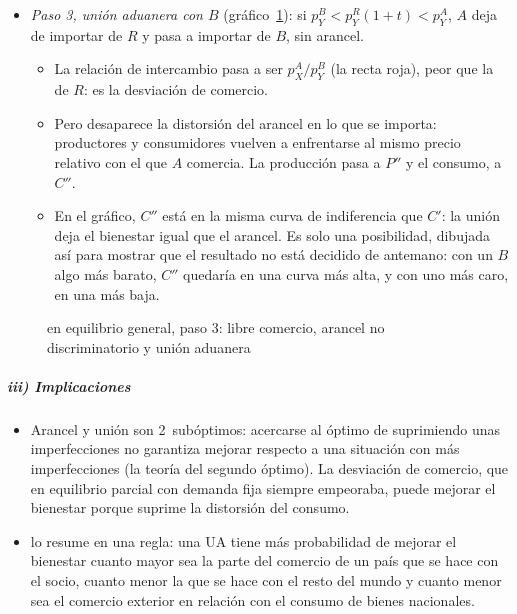 \documentclass[11pt]{article}
\begin{document}
\begin{itemize}
\item \emph{Paso 3, unión aduanera con $B$} (gráfico~\ref{fig:lipsey-eg}): si $p_Y^B<p_Y^R(1+t)<p_Y^A$, $A$ deja de importar de $R$ y pasa a importar de $B$, sin arancel.
  \begin{itemize}
  \item La relación de intercambio pasa a ser $p_X^A/p_Y^B$ (la recta roja), peor que la de $R$: es la desviación de comercio.
  \item Pero desaparece la distorsión del arancel en lo que se importa: productores y consumidores vuelven a enfrentarse al mismo precio relativo con el que $A$ comercia. La producción pasa a $P''$ y el consumo, a $C''$.
  \item En el gráfico, $C''$ está en la misma curva de indiferencia que $C'$: la unión deja el bienestar igual que el arancel. Es solo una posibilidad, dibujada así para mostrar que el resultado no está decidido de antemano: con un $B$ algo más barato, $C''$ quedaría en una curva más alta, y con uno más caro, en una más baja.
  \end{itemize}
\end{itemize}

\begin{figure}[H]
\centering
\caption{ en equilibrio general, paso 3: libre comercio, arancel no discriminatorio y unión aduanera}\label{fig:lipsey-eg}
\end{figure}

\subparagraph{iii) Implicaciones}

\begin{itemize}
\item Arancel y unión son 2~subóptimos: acercarse al óptimo de  suprimiendo unas imperfecciones no garantiza mejorar respecto a una situación con más imperfecciones (la teoría del segundo óptimo). La desviación de comercio, que en equilibrio parcial con demanda fija siempre empeoraba, puede mejorar el bienestar porque suprime la distorsión del consumo.
\item \textcite{Lipsey1960Customs} lo resume en una regla: una UA tiene más probabilidad de mejorar el bienestar cuanto mayor sea la parte del comercio de un país que se hace con el socio, cuanto menor la que se hace con el resto del mundo y cuanto menor sea el comercio exterior en relación con el consumo de bienes nacionales.
\end{itemize}
\end{document}
